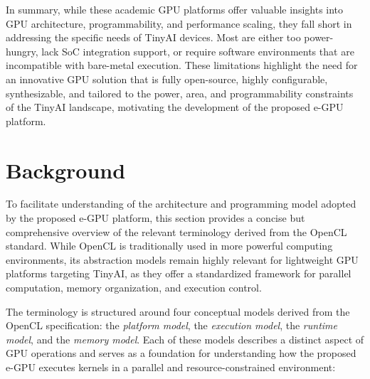                 In summary, while these academic GPU platforms offer valuable insights into GPU architecture, programmability, and performance scaling, they fall short in addressing the specific needs of TinyAI devices. Most are either too power-hungry, lack SoC integration support, or require software environments that are incompatible with bare-metal execution. These limitations highlight the need for an innovative GPU solution that is fully open-source, highly configurable, synthesizable, and tailored to the power, area, and programmability constraints of the TinyAI landscape, motivating the development of the proposed \mbox{e-GPU} platform.

    \section{Background}
    \label{sec:background}
        
        To facilitate understanding of the architecture and programming model adopted by the proposed \mbox{e-GPU} platform, this section provides a concise but comprehensive overview of the relevant terminology derived from the OpenCL standard. While OpenCL is traditionally used in more powerful computing environments, its abstraction models remain highly relevant for lightweight GPU platforms targeting TinyAI, as they offer a standardized framework for parallel computation, memory organization, and execution control.
        
        The terminology is structured around four conceptual models derived from the OpenCL specification: the \emph{platform model}, the \emph{execution model}, the \emph{runtime model}, and the \emph{memory model}. Each of these models describes a distinct aspect of GPU operations and serves as a foundation for understanding how the proposed \mbox{e-GPU} executes kernels in a parallel and resource-constrained environment:

